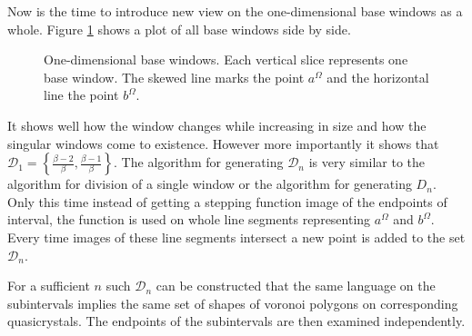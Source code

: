 \documentclass[text.tex]{subfiles}
\begin{document}
Now is the time to introduce new view on the one-dimensional base windows as a whole. Figure \ref{fig:allBaseWindows} shows a plot of all base windows side by side.

\begin{figure}[h]
\centering
{}
\caption{One-dimensional base windows. Each vertical slice represents one base window. The skewed line marks the point $a^\Omega$ and the horizontal line the point $b^\Omega$.}
\label{fig:allBaseWindows}
\end{figure}

It shows well how the window changes while increasing in size and how the singular windows come to existence. However more importantly it shows that $\mathcal{D}_1 = \left\{\frac{\beta-2}{\beta}, \frac{\beta-1}{\beta}\right\}$.
The algorithm for generating $\mathcal{D}_n$ is very similar to the algorithm for division of a single window or the algorithm for generating $D_n$. Only this time instead of getting a stepping function image of the endpoints of interval, the function is used on whole line segments representing $a^\Omega$ and $b^\Omega$. Every time images of these line segments intersect a new point is added to the set $\mathcal{D}_n$.

For a sufficient $n$ such $\mathcal{D}_n$ can be constructed that the same language on the subintervals implies the same set of shapes of voronoi polygons on corresponding quasicrystals. The endpoints of the subintervals are then examined independently. 
\end{document}
